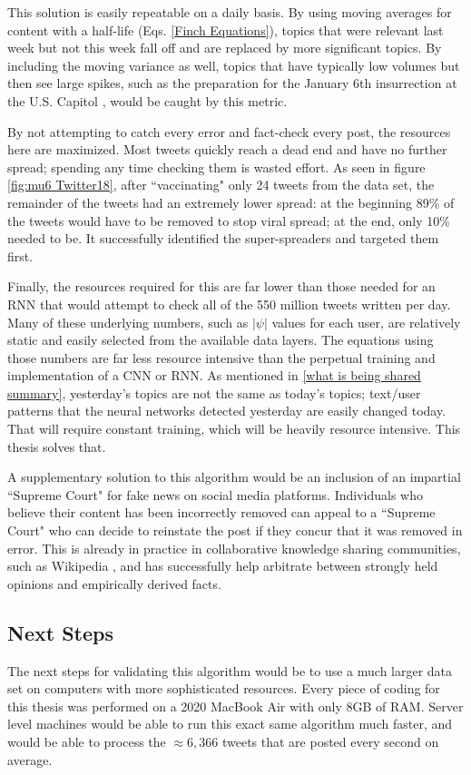 \documentclass[preprint,review,12pt]{elsarticle}
\begin{document}
This solution is easily repeatable on a daily basis. By using moving averages for content with a half-life (Eqs. \ref{Finch Equations}), topics that were relevant last week but not this week fall off and are replaced by more significant topics. By including the moving variance as well, topics that have typically low volumes but then see large spikes, such as the preparation for the January 6th insurrection at the U.S. Capitol \cite{Levenson2021capitol}, would be caught by this metric. 

By not attempting to catch every error and fact-check every post, the resources here are maximized. Most tweets quickly reach a dead end and have no further spread; spending any time checking them is wasted effort. As seen in figure \ref{fig:mu6 Twitter18}, after ``vaccinating" only 24 tweets from the data set, the remainder of the tweets had an extremely lower spread: at the beginning 89\% of the tweets would have to be removed to stop viral spread; at the end, only 10\% needed to be. It successfully identified the super-spreaders and targeted them first.

Finally, the resources required for this are far lower than those needed for an RNN that would attempt to check all of the 550 million tweets written per day. Many of these underlying numbers, such as $|\psi|$ values for each user, are relatively static and easily selected from the available data layers. The equations using those numbers are far less resource intensive than the perpetual training and implementation of a CNN or RNN. As mentioned in \ref{what is being shared summary}, yesterday's topics are not the same as today's topics; text/user patterns that the neural networks detected yesterday are easily changed today. That will require constant training, which will be heavily resource intensive. This thesis solves that.

A supplementary solution to this algorithm would be an inclusion of an impartial ``Supreme Court" for fake news on social media platforms. Individuals who believe their content has been incorrectly removed can appeal to a ``Supreme Court" who can decide to reinstate the post if they concur that it was removed in error. This is already in practice in collaborative knowledge sharing communities, such as Wikipedia \cite{hara2016co}, and has successfully help arbitrate between strongly held opinions and empirically derived facts. 

\subsection{Next Steps}
The next steps for validating this algorithm would be to use a much larger data set on computers with more sophisticated resources. Every piece of coding for this thesis was performed on a 2020 MacBook Air with only 8GB of RAM. Server level machines would be able to run this exact same algorithm much faster, and would be able to process the $\approx 6,366$ tweets that are posted every second on average. 
\end{document}
